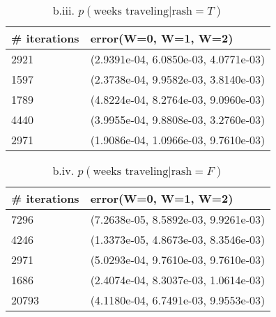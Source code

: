 \documentclass{article}
\begin{document}
\begin{enumerate}[label=(d)]
\begin{table}[h]
\centering
\caption{b.iii. $p(\text{weeks traveling}|\text{rash}=T)$}
\label{table:iii}
\begin{tabular}{|l|l|}
\hline
 \# iterations  & error(W=0, W=1, W=2)   \\
\hline \hline
2921 & (2.9391e-04, 6.0850e-03, 4.0771e-03) \\
1597 & (2.3738e-04, 9.9582e-03, 3.8140e-03) \\
1789 & (4.8224e-04, 8.2764e-03, 9.0960e-03) \\
4440 & (3.9955e-04, 9.8808e-03, 3.2760e-03) \\
2971 & (1.9086e-04, 1.0966e-03, 9.7610e-03) \\
\hline
\end{tabular}
\end{table}

\begin{table}[h]
\centering
\caption{b.iv. $p(\text{weeks traveling}|\text{rash}=F)$}
\label{table:iv}
\begin{tabular}{|l|l|}
\hline
 \# iterations  & error(W=0, W=1, W=2)   \\
\hline \hline
7296 & (7.2638e-05, 8.5892e-03, 9.9261e-03) \\
4246 & (1.3373e-05, 4.8673e-03, 8.3546e-03) \\
2971 & (5.0293e-04, 9.7610e-03, 9.7610e-03) \\
1686 & (2.4074e-04, 8.3037e-03, 1.0614e-03) \\
20793 & (4.1180e-04, 6.7491e-03, 9.9553e-03) \\
\hline
\end{tabular}
\end{table}


\end{enumerate}
\end{document}
